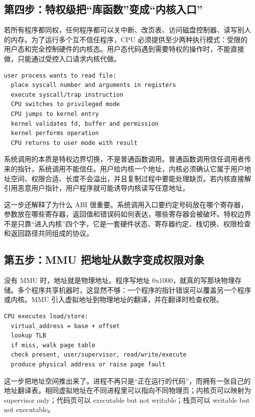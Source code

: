 \subsection{第四步：特权级把“库函数”变成“内核入口”}

若所有程序都同权，任何程序都可以关中断、改页表、访问磁盘控制器、读写别人的内存。为了运行多个互不信任程序，CPU 必须提供至少两种执行模式：受限的用户态和完全控制硬件的内核态。用户态代码遇到需要特权的操作时，不能直接做，只能通过受控入口请求内核代做。

\begin{lstlisting}
user process wants to read file:
  place syscall number and arguments in registers
  execute syscall/trap instruction
  CPU switches to privileged mode
  CPU jumps to kernel entry
  kernel validates fd, buffer and permission
  kernel performs operation
  CPU returns to user mode with result
\end{lstlisting}

系统调用的本质是特权边界切换，不是普通函数调用。普通函数调用信任调用者传来的指针，系统调用不能信任。用户给内核一个地址，内核必须确认它属于用户地址空间、权限合适、长度不会溢出，并且复制过程中要能处理缺页。若内核直接解引用恶意用户指针，用户程序就可能诱导内核读写任意地址。

这一步还解释了为什么 ABI 很重要。系统调用入口要约定号码放在哪个寄存器，参数放在哪些寄存器，返回值和错误码如何表达，哪些寄存器会被破坏。特权边界不是只靠“进入内核”四个字，它是一套硬件状态、寄存器约定、栈切换、权限检查和返回路径共同组成的协议。

\subsection{第五步：MMU 把地址从数字变成权限对象}

没有 MMU 时，地址就是物理地址。程序写地址 0x1000，就真的写那块物理存储。多个程序共享机器时，这显然不够：一个程序的指针错误可以覆盖另一个程序或内核。MMU 引入虚拟地址到物理地址的翻译，并在翻译时检查权限。

\begin{lstlisting}
CPU executes load/store:
  virtual_address = base + offset
  lookup TLB
  if miss, walk page table
  check present, user/supervisor, read/write/execute
  produce physical address or raise page fault
\end{lstlisting}

这一步把地址空间推出来了。进程不再只是“正在运行的代码”，而拥有一张自己的地址翻译表。相同虚拟地址在不同进程里可以指向不同物理页；内核页可以映射为 supervisor only；代码页可以 executable but not writable；栈页可以 writable but not executable。

